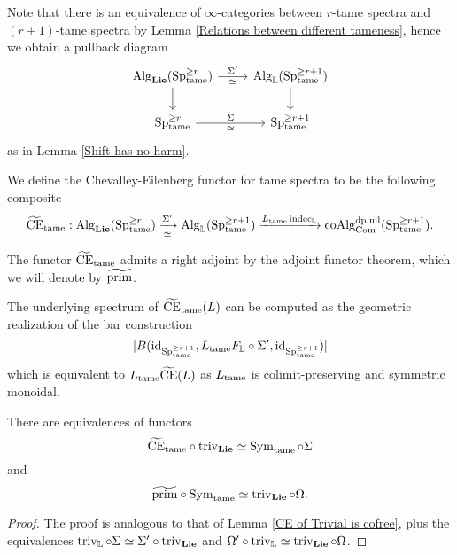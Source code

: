 Note that there is an equivalence of $\infty$-categories between $r$-tame spectra and $(r+1)$-tame spectra by Lemma \ref{Relations between different tameness}, hence we obtain a pullback diagram 
\[
    \begin{tikzcd}
	\Alg_{\spLie}(\Sp^{\geq r}_{\tame})    & \Alg_{\BL}(\Sp^{\geq r+1}_{\tame})\\
	 \Sp^{\geq r}_{\tame} & \Sp^{\geq r+1}_{\tame}
	\arrow[from=1-1, to = 1-2, "\Sigma'", "\simeq" below]
	\arrow[from=1-1 , to =2-1,  left]
	\arrow[from=1-2 , to =2-2,  right]
	\arrow[from=2-1, to=2-2, "\Sigma", "\simeq" below]
\end{tikzcd}
\]
as in Lemma \ref{Shift has no harm}.

\begin{definition}
\label{Chevalley-Eilenberg functor for tame spectra}
We define the Chevalley-Eilenberg functor for tame spectra
to be the following composite
$$
\widetilde{\operatorname{CE}}_{\operatorname{\operatorname{tame}}}: \operatorname{Alg}_{\mathbf{Lie}}(\operatorname{Sp}^{\geq r}_{\operatorname{\operatorname{tame}}})
\xrightarrow[\simeq]{\Sigma'}
\operatorname{Alg}_{{\mathbb{L}}}(\operatorname{Sp}^{\geq r+1}_{\operatorname{\operatorname{tame}}})
\xrightarrow{L_{\operatorname{\operatorname{tame}}} \operatorname{indec}_{{\mathbb{L}}}}
\operatorname{coAlg}^{\operatorname{dp}, \operatorname{nil}}_{\operatorname{Com}}(\operatorname{Sp}^{\geq r+1}_{\operatorname{\operatorname{tame}}}).
$$
\end{definition}

\begin{definition}
The functor $\widetilde{\operatorname{CE}}_{\operatorname{\operatorname{tame}}}$ admits a right adjoint by the adjoint functor theorem, which we will denote by $\widetilde{\operatorname{prim}}$.
\end{definition}



\begin{remark}
\label{Formula for computing CE_tame(L)}
The underlying spectrum of $\widetilde{\operatorname{CE}}_{\operatorname{\operatorname{tame}}}(L)$ can be computed as the geometric realization of the bar construction 
$$
|B(\operatorname{id}_{\operatorname{Sp}^{\geq r+1}_{\operatorname{\operatorname{tame}}}}, L_{\operatorname{\operatorname{tame}}}F_{{\mathbb{L}}}\circ \Sigma', \operatorname{id}_{\operatorname{Sp}^{\geq r+1}_{\operatorname{\operatorname{tame}}}})|
$$
which is equivalent to $L_{\operatorname{\operatorname{tame}}}\widetilde{\operatorname{CE}}(L)$ as $L_{\operatorname{\operatorname{tame}}}$ is colimit-preserving and symmetric monoidal.
\end{remark}

\begin{lemma}
\label{Lemma 3.6.20}
There are equivalences of functors
$$
\widetilde{\operatorname{CE}}_{\operatorname{\operatorname{tame}}}\circ \operatorname{triv}_{\mathbf{Lie}}\simeq \operatorname{Sym}_{\operatorname{\operatorname{tame}}}\circ \Sigma
$$
and
$$
\widetilde{\operatorname{prim}}\circ \operatorname{Sym}_{\operatorname{\operatorname{tame}}} \simeq \operatorname{triv}_{\mathbf{Lie}}\circ \Omega.
$$
\end{lemma}
\begin{proof}
    The proof is analogous to that of Lemma \ref{CE of Trivial is cofree}, plus the equivalences 
    $
    \operatorname{triv}_{{\mathbb{L}}}\circ \Sigma \simeq \Sigma'\circ \operatorname{triv}_{\mathbf{Lie}} 
    $
    and $\Omega' \circ \operatorname{triv}_{{\mathbb{L}}} \simeq \operatorname{triv}_{\mathbf{Lie}}\circ \Omega $.
    
\end{proof}



